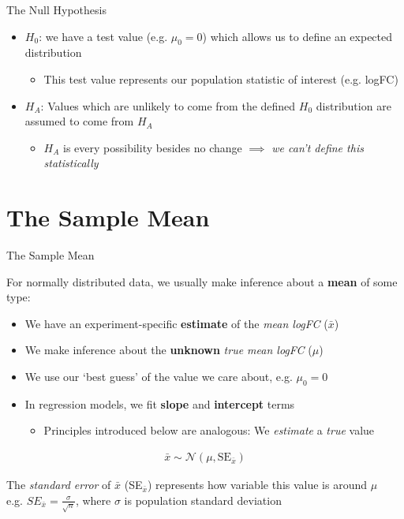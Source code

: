 \documentclass[aspectratio=169,11pt]{beamer}
\begin{document}
\begin{frame}{The Null Hypothesis}

	\begin{itemize}
		\item $H_0$: we have a test value (e.g. $\mu_0 = 0$) which allows us to define an expected distribution
		\begin{itemize}
			\item This test value represents our population statistic of interest (e.g. logFC)
		\end{itemize}
		\item $H_A$: Values which are unlikely to come from the defined $H_0$ distribution are assumed to come from $H_A$
		\begin{itemize}
			\item $H_A$ is every possibility besides no change $\implies$ \textit{we can't define this statistically}
		\end{itemize}
	\end{itemize}


\end{frame}

\section{The Sample Mean}

\begin{frame}{The Sample Mean}

For normally distributed data, we usually make inference about a \textbf{mean} of some type:

	\begin{itemize}
		\item We have an experiment-specific \textbf{estimate} of the \textit{mean logFC} ($\bar{x}$)
		\item We make inference about the \textbf{unknown} \textit{true mean logFC} ($\mu$)
		\item We use our `best guess' of the value we care about, e.g. $\mu_0 = 0$
		\pause
		\item In regression models, we fit \textbf{slope} and \textbf{intercept} terms 
		\begin{itemize}
			\item Principles introduced below are analogous: We \textit{estimate} a \textit{true} value
		\end{itemize}
	\end{itemize}


	\pause
	\begin{align*}
		\bar{x} \sim \mathcal{N}(\mu, \text{SE}_{\bar{x}})
	\end{align*}
	
	The \textit{standard error} of $\bar{x}$ (SE$_{\bar{x}}$) represents how variable this value is around $\mu$\\
	e.g. $SE_{\bar{x}} = \frac{\sigma}{\sqrt{n}}$, where $\sigma$ is population standard deviation


\end{frame}
\end{document}
